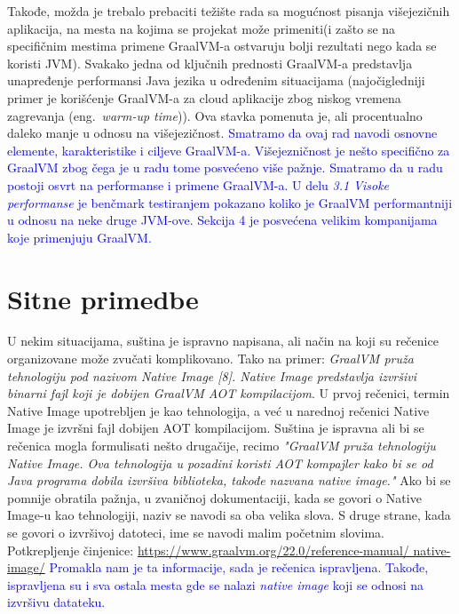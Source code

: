 \documentclass[a4paper]{report}
\newcommand{\odgovor}[1]{\textcolor{blue}{#1}}
\begin{document}
Takođe, možda je trebalo prebaciti težište rada sa mogućnost pisanja višejezičnih aplikacija, na mesta na kojima se projekat može primeniti(i 
zašto se na specifičnim mestima primene GraalVM-a ostvaruju bolji rezultati nego kada se koristi JVM). Svakako jedna od ključnih prednosti 
GraalVM-a predstavlja unapređenje performansi Java jezika u određenim situacijama (najočigledniji primer je korišćenje GraalVM-a za cloud 
aplikacije zbog niskog vremena zagrevanja (eng.~{\em warm-up time})). Ova stavka pomenuta je, ali procentualno daleko manje u odnosu na 
višejezičnost.
\odgovor{Smatramo da ovaj rad navodi osnovne elemente, karakteristike i ciljeve GraalVM-a. Višejezničnost je nešto specifično za GraalVM zbog čega je u radu tome posvećeno više pažnje. Smatramo da u radu postoji osvrt na performanse i primene GraalVM-a. U delu \emph{3.1 Visoke performanse} je benčmark testiranjem pokazano koliko je GraalVM performantniji u odnosu na neke druge JVM-ove. Sekcija 4 je posvećena velikim kompanijama koje primenjuju GraalVM.}

\section{Sitne primedbe}
U nekim situacijama, suština je ispravno napisana, ali način na koji su rečenice organizovane može zvučati komplikovano. Tako na primer: 
\textit{GraalVM pruža tehnologiju pod nazivom Native Image [8]. Native Image predstavlja izvršivi binarni fajl koji je dobijen GraalVM AOT 
kompilacijom}. U prvoj rečenici, termin Native Image upotrebljen je kao tehnologija, a već u narednoj rečenici Native Image je izvršni fajl 
dobijen AOT kompilacijom. Suština je ispravna ali bi se rečenica mogla formulisati nešto drugačije, recimo \textit{"GraalVM pruža tehnologiju 
Native Image. Ova tehnologija u pozadini koristi AOT kompajler kako bi se od Java programa dobila izvršiva biblioteka, takođe nazvana native 
image."} Ako bi se pomnije obratila pažnja, u zvaničnoj dokumentaciji, kada se govori o Native Image-u kao tehnologiji, naziv se navodi sa oba 
velika slova. S druge strane, kada se govori o izvršivoj datoteci, ime se navodi malim početnim slovima. 
Potkrepljenje činjenice: \href{https://www.graalvm.org/22.0/reference-manual/native-image/}{https://www.graalvm.org/22.0/reference-manual/
native-image/} \odgovor{Promakla nam je ta informacije, sada je rečenica ispravljena. Takođe, ispravljena su i sva ostala mesta gde se nalazi \emph{native image} koji se odnosi na izvršivu datateku.}
\end{document}
